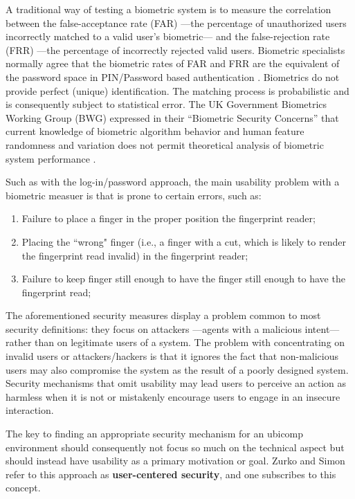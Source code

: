 \documentclass{article}
\begin{document}
A traditional way of testing a biometric system is to measure the correlation between the false-acceptance rate (FAR) ---the percentage of unauthorized users incorrectly matched to a valid user's biometric--- and the false-rejection rate (FRR) ---the percentage of incorrectly rejected valid users. Biometric specialists normally agree that the biometric rates of FAR and FRR are the equivalent of the password space in PIN/Password based authentication \cite{biometrics2003biometrics}. Biometrics do not provide perfect (unique) identification. The matching process is probabilistic and is consequently subject to statistical error.    The UK Government Biometrics Working Group (BWG) expressed in their “Biometric Security Concerns” that current knowledge of biometric algorithm behavior and human feature randomness and variation does not permit theoretical analysis of biometric system performance \cite{biometrics2003biometrics}.

Such as with the log-in/password approach, the main usability problem with a biometric measuer is that is prone to certain errors, such as:
\begin{enumerate}
\item Failure to place a finger in the proper position the fingerprint reader;
\item Placing the ``wrong" finger (i.e., a finger with a cut, which is likely to render the fingerprint read invalid) in the fingerprint reader;
\item Failure to keep finger still enough to have the finger still enough to have the fingerprint read;
\end{enumerate}

The aforementioned security measures display a problem common to most security definitions: they focus on attackers ---agents with a malicious intent--- rather than on legitimate users of a system. The problem with concentrating on invalid users or attackers/hackers is that it ignores the fact that non-malicious users may also compromise the system as the result of a poorly designed system.  Security mechanisms that omit usability may lead users to perceive an action as harmless when it is not or mistakenly encourage users to engage in an insecure interaction. 

The key to finding an appropriate security mechanism for an ubicomp environment should consequently not focus so much on the technical aspect but should instead have usability as a primary motivation or goal.  Zurko and Simon \cite{zurko1996user} refer to this approach as \textbf{user-centered security}, and one subscribes to this concept. 
\end{document}

